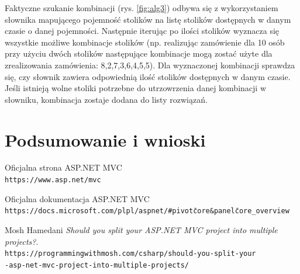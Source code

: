 \documentclass{article}
\begin{document}
Faktyczne szukanie kombinacji (rys. \ref{fig:alg3}) odbywa się z wykorzystaniem słownika mapującego pojemność stolików na listę stolików dostępnych w danym czasie o danej pojemności. Następnie iterując po ilości stolików wyznacza się wszystkie możliwe kombinacje stolików (np. realizując zamówienie dla 10 osób przy użyciu dwóch stolików następujące kombinacje mogą zostać użyte dla zrealizowania zamówienia: {{8,2},{7,3},{6,4},{5,5}}). Dla wyznaczonej kombinacji sprawdza się, czy słownik zawiera odpowiednią ilość stolików dostępnych w danym czasie. Jeśli istnieją wolne stoliki potrzebne do utrzowrzenia danej kombinacji w słowniku, kombinacja zostaje dodana do listy rozwiązań.


\section{Podsumowanie i wnioski}


\newpage
\begin{thebibliography}{9}

Oficjalna strona ASP.NET MVC
\\\texttt{https://www.asp.net/mvc}

Oficjalna dokumentacja ASP.NET MVC
\\\texttt{https://docs.microsoft.com/pl\-pl/aspnet/\#pivot\=core\&panel\=core\_overview}

Mosh Hamedani
\textit{Should you split your ASP.NET MVC project into multiple projects?}.
\\\texttt{https://programmingwithmosh.com/csharp/should-you-split-your\\-asp-net-mvc-project-into-multiple-projects/}

\end{thebibliography}
\end{document}
